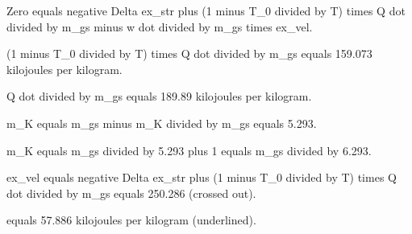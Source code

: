 Zero equals negative Delta ex_str plus (1 minus T_0 divided by T) times Q dot divided by m_gs minus w dot divided by m_gs times ex_vel.  

(1 minus T_0 divided by T) times Q dot divided by m_gs equals 159.073 kilojoules per kilogram.  

Q dot divided by m_gs equals 189.89 kilojoules per kilogram.  

m_K equals m_gs minus m_K divided by m_gs equals 5.293.  

m_K equals m_gs divided by 5.293 plus 1 equals m_gs divided by 6.293.  

ex_vel equals negative Delta ex_str plus (1 minus T_0 divided by T) times Q dot divided by m_gs equals 250.286 (crossed out).  

equals 57.886 kilojoules per kilogram (underlined).